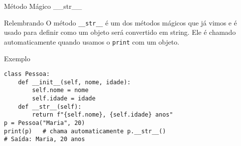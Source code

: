 \begin{frame}[fragile]{Método Mágico \_\_str\_\_}

\begin{block}{Relembrando}
O método \texttt{\_\_str\_\_} é um dos métodos mágicos que já vimos e é usado para definir como um objeto será convertido em string.  
Ele é chamado automaticamente quando usamos o \texttt{print} com um objeto.
\end{block}

\begin{exampleblock}{Exemplo}
\begin{verbatim}
class Pessoa:
    def __init__(self, nome, idade):
        self.nome = nome
        self.idade = idade
    def __str__(self):
        return f"{self.nome}, {self.idade} anos"
p = Pessoa("Maria", 20)
print(p)   # chama automaticamente p.__str__()
# Saída: Maria, 20 anos
\end{verbatim}
\end{exampleblock}

\end{frame}


